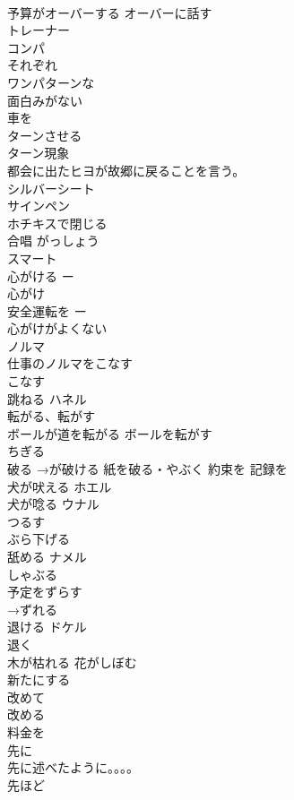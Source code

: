 \documentclass[8pt]{extreport}
\begin{document}
\begin{CJK}{UTF8}{min}
\\	予算がオーバーする オーバーに話す	
\\	トレーナー	
\\	コンパ	
\\	それぞれ	
\\	ワンパターンな	
\\	面白みがない
\\	車を
\\	ターンさせる 
\\	ターン現象	
\\	都会に出たヒヨが故郷に戻ることを言う。
\\	シルバーシート	
\\	サインペン	
\\	ホチキスで閉じる	
\\	合唱	がっしょう 
\\	スマート	
\\	心がける ー
\\	心がけ	
\\	安全運転を ー
\\	心がけがよくない 
\\	ノルマ	
\\	仕事のノルマをこなす　
\\	こなす	
\\	跳ねる	ハネル 
\\	転がる、転がす	
\\	ボールが道を転がる ボールを転がす
\\	ちぎる	
\\	破る →が破ける	紙を破る・やぶく 約束を 記録を
\\	犬が吠える	ホエル
\\	犬が唸る	ウナル 
\\	つるす	
\\	ぶら下げる	
\\	舐める	ナメル 
\\	しゃぶる	
\\	予定をずらす	
\\	→ずれる
\\	退ける	ドケル 
\\	退く
\\	木が枯れる 花がしぼむ	
\\	新たにする	
\\	改めて	
\\	改める	
\\	料金を 
\\	先に	
\\	先に述べたように。。。。
\\	先ほど	

\end{CJK}
\end{document}

